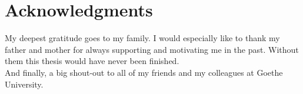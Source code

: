 \chapter*{Acknowledgments}
\label{cha:acknowledgments}


\noindent
My deepest gratitude goes to my family. I would especially like to thank my father and mother for always supporting and motivating me in the past. Without them this thesis would have never been finished.\\

\noindent
And finally, a big shout-out to all of my friends and my colleagues at Goethe University.